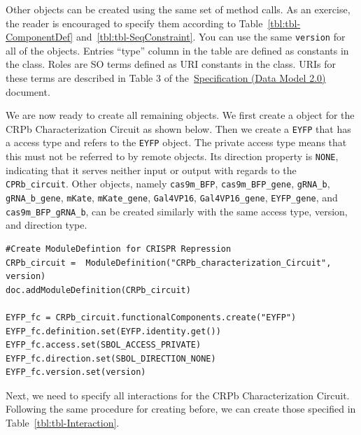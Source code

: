 Other  objects can be created using the same set of method calls. As an exercise, the reader is encouraged to specify them according to Table~\ref{tbl:tbl-ComponentDef} and~\ref{tbl:tbl-SeqConstraint}. You can use the same \lstinline+version+ for all of the  objects. Entries ``type'' column in the table are defined as constants in the  class. Roles are SO terms defined as URI constants in the  class. URIs for these terms are described in Table 3 of the~\href{http://sbolstandard.org/downloads/specification-data-model-2-0/}{Specification  (Data Model 2.0)} document.

We are now ready to create all remaining  objects. We first create a  object for the CRPb Characterization Circuit as shown below. Then we create a  \lstinline+EYFP+ that has a  access type and refers to the \lstinline+EYFP+  object. The private access type means that this  must not be referred to by remote  objects. Its direction property is \lstinline+NONE+, indicating that it serves neither input or output with regards to the \lstinline+CPRb_circuit+. Other  objects, namely \lstinline+cas9m_BFP+, \lstinline+cas9m_BFP_gene+, \lstinline+gRNA_b+, \lstinline+gRNA_b_gene+, \lstinline+mKate+, \lstinline+mKate_gene+, \lstinline+Gal4VP16+, \lstinline+Gal4VP16_gene+, \lstinline+EYFP_gene+, and \lstinline+cas9m_BFP_gRNA_b+, can be created similarly with the same access type, version, and direction type. 

\vspace{\abovedisplayskip}
\begin{minipage}{0.95\textwidth}
\begin{lstlisting}
#Create ModuleDefintion for CRISPR Repression
CRPb_circuit =  ModuleDefinition("CRPb_characterization_Circuit", version)
doc.addModuleDefinition(CRPb_circuit)

EYFP_fc = CRPb_circuit.functionalComponents.create("EYFP")
EYFP_fc.definition.set(EYFP.identity.get())
EYFP_fc.access.set(SBOL_ACCESS_PRIVATE)
EYFP_fc.direction.set(SBOL_DIRECTION_NONE)
EYFP_fc.version.set(version)
\end{lstlisting}
\end{minipage}

Next, we need to specify all interactions for the CRPb Characterization Circuit. Following the same procedure for creating  before, we can create those specified in Table~\ref{tbl:tbl-Interaction}. 

